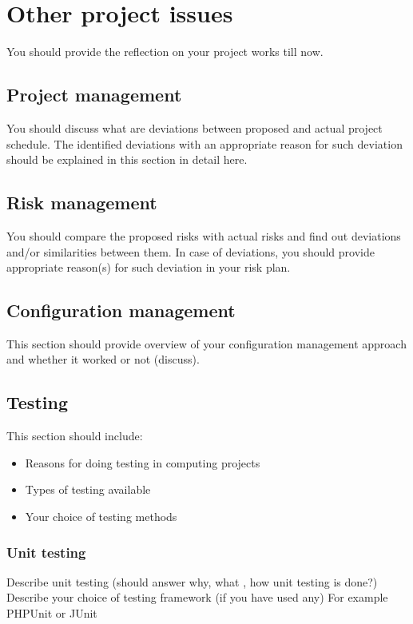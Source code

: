 \chapter{Other project issues} %
\label{cha:others}
You should provide the reflection on your project works till now.

\section{Project management} %
\label{sec:project_management}
You should discuss what are deviations between proposed and actual project schedule. The identified deviations with an appropriate reason for such deviation should be explained in this section in detail here.

\section{Risk management} %
\label{sec:risk_management}
You should compare the proposed risks with actual risks and find out deviations and/or similarities between them. In case of deviations, you should provide appropriate reason(s) for such deviation in your risk plan.
\section{Configuration management} %
\label{sec:configuration_management}
This section should provide overview of your configuration management approach and whether it worked or not (discuss).

\section{Testing} %
\label{sec:testing}
This section should include:
\begin{itemize}
  \item Reasons for doing testing in computing projects
  \item Types of testing available
  \item Your choice of testing methods
\end{itemize}

\subsection{Unit testing} %
\label{sub:unit_testing}
Describe unit testing (should answer why, what , how unit testing is done?)
Describe your choice of testing framework (if you have used any) For example PHPUnit or JUnit

